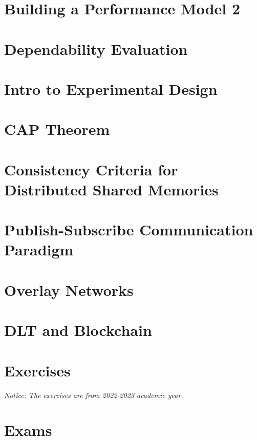 \documentclass{article}
\begin{document}
	\newpage
	\section{Building a Performance Model 2}
	
	\newpage
	\section{Dependability Evaluation}
	
	\newpage
	\section{Intro to Experimental Design}
	
	\newpage
	\section{CAP Theorem}
	
	\newpage
	\section{Consistency Criteria for Distributed Shared Memories}
	
	\newpage
	\section{Publish-Subscribe Communication Paradigm}
	
	\newpage
	\section{Overlay Networks}
	
	\newpage
	\section{DLT and Blockchain}
	
	\newpage
	\section{Exercises}
	\emph{Notice: The exercises are from 2022-2023 academic year.}
	
	\newpage
	\section{Exams}
	
	
\end{document}
